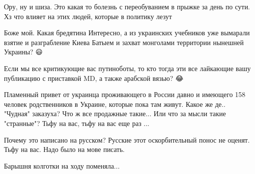 \begin{itemize}
\begin{itemize}
\end{itemize}

\par
 
Ору, ну и шиза. Это какая то болезнь с переобуванием в прыжке за день по сути.
Хз что влияет на этих людей, которые в политику лезут

%
%

Боже мой. Какая бредятина \Smiley[1.0][yellow] Интересно, а из украинских учебников уже вымарали
взятие и разграбление Киева Батыем и захват монголами территории нынешней
Украины? 😃


 
Если мы все критикующие вас путиноботы, то кто тогда эти все лайкающие вашу
публикацию с приставкой MD, а также арабской вязью? 😂

%
%

Пламенный привет от украинца проживающего в России давно и имеющего 158 человек
родственников в Украине, которые пока там живут. Какое же де.. "Чудная"
заказуха? Что ж все продажные такие... Или что за мысли такие "странные"? Тьфу
на вас, тьфу на вас еще раз ...

 
Почему это написано на русском? Русские этот оскорбительный понос не оценят. Тьфу на вас. Надо было на мове писать.

 
Барышня колготки на ходу поменяла... \Smiley[1.0][yellow]

 

\end{itemize}
